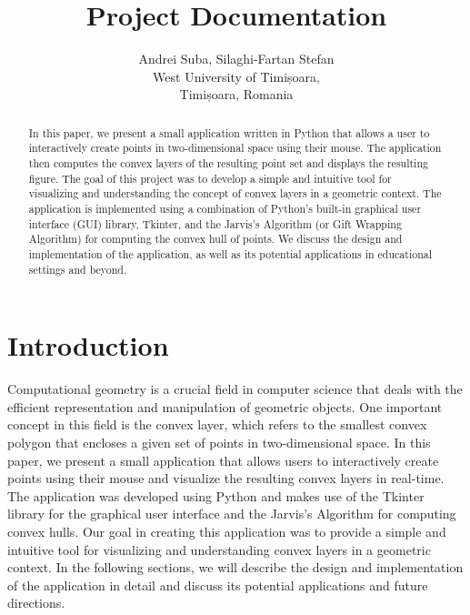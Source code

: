 \documentclass{article}
\title{\textbf{Project Documentation}}
\author{Andrei Suba, Silaghi-Fartan Stefan\\
	West University of Timișoara,\\
	Timișoara, Romania
    }
\date{}
\begin{document}
\maketitle
\thispagestyle{empty}

\begin{abstract}

\noindent In this paper, we present a small application written in Python that allows a user to interactively create points in two-dimensional space using their mouse. The application then computes the convex layers of the resulting point set and displays the resulting figure. The goal of this project was to develop a simple and intuitive tool for visualizing and understanding the concept of convex layers in a geometric context. The application is implemented using a combination of Python's built-in graphical user interface (GUI) library, Tkinter, and the Jarvis's Algorithm (or Gift Wrapping Algorithm) for computing the convex hull of points. We discuss the design and implementation of the application, as well as its potential applications in educational settings and beyond.

\end{abstract}

\clearpage

\tableofcontents

\clearpage

\section{Introduction}

Computational geometry is a crucial field in computer science that deals with the efficient representation and manipulation of geometric objects. One important concept in this field is the convex layer, which refers to the smallest convex polygon that encloses a given set of points in two-dimensional space. In this paper, we present a small application that allows users to interactively create points using their mouse and visualize the resulting convex layers in real-time. The application was developed using Python and makes use of the Tkinter library for the graphical user interface and the Jarvis's Algorithm for computing convex hulls. Our goal in creating this application was to provide a simple and intuitive tool for visualizing and understanding convex layers in a geometric context. In the following sections, we will describe the design and implementation of the application in detail and discuss its potential applications and future directions.
\end{document}
